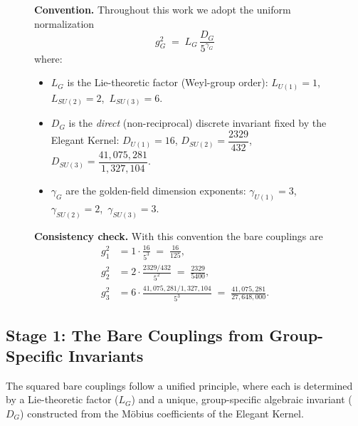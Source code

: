 \documentclass[11pt,twocolumn]{article}
\begin{document}
\begin{figure}[t]
\begin{tcolorbox}[colback=yellow!6!white,colframe=yellow!40!black,
title=\textbf{Normalization Patch: Master Formula for Gauge Couplings}]
\begin{minipage}[t]{0.48\linewidth}
\textbf{Convention.} Throughout this work we adopt the uniform normalization
\[
\boxed{\quad g_G^2 \;=\; L_G \,\frac{D_G}{5^{\gamma_G}} \quad}
\]
where:
\begin{itemize}[leftmargin=1.2em,itemsep=0.25em]
    \item $L_G$ is the Lie-theoretic factor (Weyl-group order):
    $L_{U(1)}=1$,\ $L_{SU(2)}=2$,\ $L_{SU(3)}=6$.
    \item $D_G$ is the \emph{direct} (non-reciprocal) discrete invariant fixed by the Elegant Kernel:
    $D_{U(1)} = 16$,\quad
    $D_{SU(2)} = \dfrac{2329}{432}$,\quad
    $D_{SU(3)} = \dfrac{41{,}075{,}281}{1{,}327{,}104}$.
    \item $\gamma_G$ are the golden-field dimension exponents:
    $\gamma_{U(1)}=3$,\ $\gamma_{SU(2)}=2$,\ $\gamma_{SU(3)}=3$.
\end{itemize}
\end{minipage}\hfill
\begin{minipage}[t]{0.46\linewidth}
\textbf{Consistency check.} With this convention the bare couplings are
\[
\begin{aligned}
g_1^2 &= 1\cdot \frac{16}{5^3} \;=\; \frac{16}{125},\\[0.4em]
g_2^2 &= 2\cdot \frac{2329/432}{5^2} \;=\; \frac{2329}{5400},\\[0.4em]
g_3^2 &= 6\cdot \frac{41{,}075{,}281/1{,}327{,}104}{5^3}
      \;=\; \frac{41{,}075{,}281}{27{,}648{,}000}.
\end{aligned}
\]
\end{minipage}
\end{tcolorbox}
\end{figure}

\subsection{Stage 1: The Bare Couplings from Group-Specific Invariants}
The squared bare couplings follow a unified principle, where each is determined by a Lie-theoretic factor ($L_G$) and a unique, group-specific algebraic invariant ($D_G$) constructed from the Möbius coefficients of the Elegant Kernel.
\end{document}
